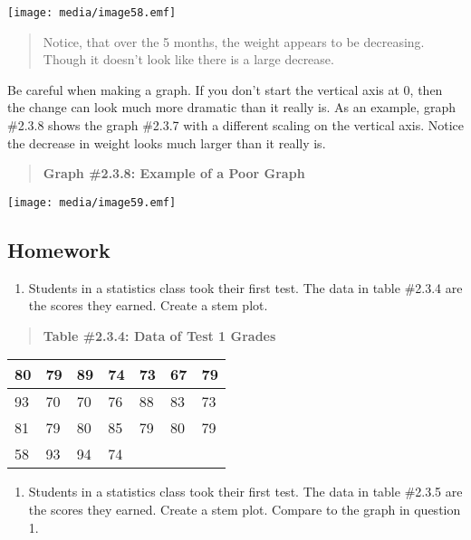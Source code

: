 \documentclass[]{book}
\providecommand{\tightlist}{%
  \setlength{\itemsep}{0pt}\setlength{\parskip}{0pt}}
\begin{document}
\texttt{[image: media/image58.emf]}

\begin{quote}
Notice, that over the 5 months, the weight appears to be decreasing.
Though it doesn't look like there is a large decrease.
\end{quote}

Be careful when making a graph. If you don't start the vertical axis at
0, then the change can look much more dramatic than it really is. As an
example, graph \#2.3.8 shows the graph \#2.3.7 with a different scaling
on the vertical axis. Notice the decrease in weight looks much larger
than it really is.

\begin{quote}
\textbf{Graph \#2.3.8: Example of a Poor Graph}
\end{quote}

\texttt{[image: media/image59.emf]}

\hypertarget{homework-6}{%
\subsection{Homework}\label{homework-6}}

\begin{enumerate}
\def\labelenumi{\arabic{enumi}.}
\tightlist
\item
  Students in a statistics class took their first test. The data in
  table \#2.3.4 are the scores they earned. Create a stem plot.
\end{enumerate}

\begin{quote}
\textbf{Table \#2.3.4: Data of Test 1 Grades}
\end{quote}

\begin{longtable}[]{@{}lllllll@{}}
\toprule
80 & 79 & 89 & 74 & 73 & 67 & 79\tabularnewline
\midrule
\endhead
93 & 70 & 70 & 76 & 88 & 83 & 73\tabularnewline
81 & 79 & 80 & 85 & 79 & 80 & 79\tabularnewline
58 & 93 & 94 & 74 & & &\tabularnewline
\bottomrule
\end{longtable}

\begin{enumerate}
\def\labelenumi{\arabic{enumi}.}
\setcounter{enumi}{1}
\tightlist
\item
  Students in a statistics class took their first test. The data in
  table \#2.3.5 are the scores they earned. Create a stem plot.
  Compare to the graph in question 1.
\end{enumerate}
\end{document}
